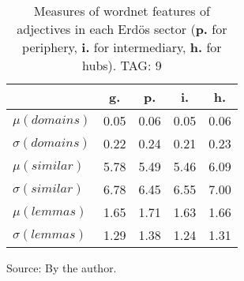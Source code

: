 \begin{table}[h!]
\begin{center}
	\caption{Measures of wordnet features of adjectives in each Erd\"os sector ({{\bf p.}} for periphery, {{\bf i.}} for intermediary, {{\bf h.}} for hubs). TAG: 9}\label{tab:wnas}
\begin{tabular}{| l || c | c | c | c |}\hline
 & {\bf g.} & {\bf p.} & {\bf i.} & {\bf h.} \\\hline\hline
$\mu(domains)$ & 0.05  & 0.06  & 0.05  & 0.06 \\
$\sigma(domains)$ & 0.22  & 0.24  & 0.21  & 0.23 \\\hline
$\mu(similar)$ & 5.78  & 5.49  & 5.46  & 6.09 \\
$\sigma(similar)$ & 6.78  & 6.45  & 6.55  & 7.00 \\\hline
$\mu(lemmas)$ & 1.65  & 1.71  & 1.63  & 1.66 \\
$\sigma(lemmas)$ & 1.29  & 1.38  & 1.24  & 1.31 \\\hline
\end{tabular}
\begin{flushleft}\footnotesize
		Source: By the author.\
\end{flushleft}
\end{center}
\end{table}
